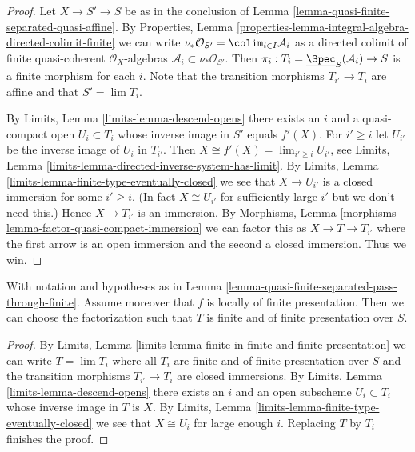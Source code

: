 \begin{proof}
Let $X \to S' \to S$ be as in the conclusion of
Lemma \ref{lemma-quasi-finite-separated-quasi-affine}.
By
Properties, Lemma
\ref{properties-lemma-integral-algebra-directed-colimit-finite}
we can write
$\nu_*\mathcal{O}_{S'} = \colim_{i \in I} \mathcal{A}_i$ as a
directed colimit of finite quasi-coherent $\mathcal{O}_X$-algebras
$\mathcal{A}_i \subset \nu_*\mathcal{O}_{S'}$. Then
$\pi_i : T_i = \underline{\Spec}_S(\mathcal{A}_i) \to S$
is a finite morphism for each $i$.
Note that the transition morphisms $T_{i'} \to T_i$ are affine
and that $S' = \lim T_i$.

\medskip\noindent
By Limits, Lemma \ref{limits-lemma-descend-opens}
there exists an $i$ and a quasi-compact open
$U_i \subset T_i$ whose inverse image in $S'$ equals
$f'(X)$. For $i' \geq i$ let $U_{i'}$ be the inverse image
of $U_i$ in $T_{i'}$. Then $X \cong f'(X) = \lim_{i' \geq i} U_{i'}$, see
Limits, Lemma \ref{limits-lemma-directed-inverse-system-has-limit}.
By Limits, Lemma \ref{limits-lemma-finite-type-eventually-closed} we see that
$X \to U_{i'}$ is a closed immersion for some $i' \geq i$.
(In fact $X \cong U_{i'}$ for sufficiently
large $i'$ but we don't need this.) Hence $X \to T_{i'}$ is an immersion. By
Morphisms, Lemma \ref{morphisms-lemma-factor-quasi-compact-immersion}
we can factor this as $X \to T \to T_{i'}$ where the first arrow
is an open immersion and the second a closed immersion. Thus we win.
\end{proof}

\begin{lemma}
\label{lemma-quasi-finite-separated-pass-through-finite-addendum}
With notation and hypotheses as in
Lemma \ref{lemma-quasi-finite-separated-pass-through-finite}.
Assume moreover that $f$ is locally of finite presentation. Then we can
choose the factorization such that $T$ is finite and of
finite presentation over $S$.
\end{lemma}

\begin{proof}
By Limits, Lemma
\ref{limits-lemma-finite-in-finite-and-finite-presentation} we can write
$T = \lim T_i$ where all $T_i$ are finite and of finite presentation
over $S$ and the transition morphisms $T_{i'} \to T_i$ are closed
immersions. By
Limits, Lemma \ref{limits-lemma-descend-opens}
there exists an $i$ and an open subscheme $U_i \subset T_i$ whose inverse
image in $T$ is $X$. By
Limits, Lemma
\ref{limits-lemma-finite-type-eventually-closed}
we see that $X \cong U_i$ for large enough $i$.
Replacing $T$ by $T_i$ finishes the proof.
\end{proof}









